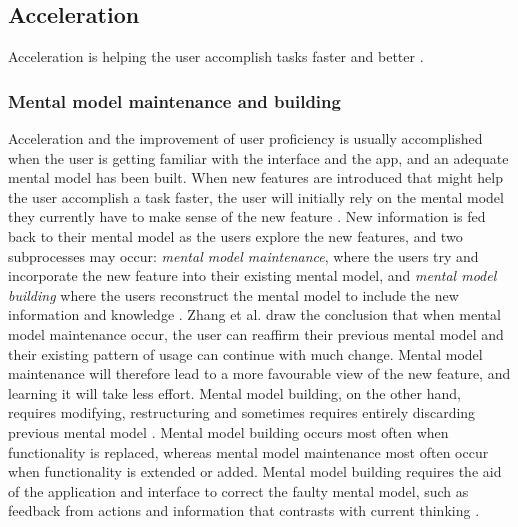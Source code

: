 \subsection{Acceleration}
Acceleration is helping the user accomplish tasks faster and better \cite{Bradt2009}.

\subsubsection{Mental model maintenance and building}
Acceleration and the improvement of user proficiency is usually accomplished when the user is getting familiar with the interface and the app, and an adequate mental model has been built. When new features are introduced that might help the user accomplish a task faster, the user will initially rely on the mental model they currently have to make sense of the new feature \cite{Orlikowski2000}. New information is fed back to their mental model as the users explore the new features, and two subprocesses may occur: \textit{mental model maintenance}, where the users try and incorporate the new feature into their existing mental model, and \textit{mental model building} where the users reconstruct the mental model to include the new information and knowledge \cite{Vandenbosch1996}. Zhang et al. \cite{Zhang2011} draw the conclusion that when mental model maintenance occur, the user can reaffirm their previous mental model and their existing pattern of usage can continue with much change. Mental model maintenance will therefore lead to a more favourable view of the new feature, and learning it will take less effort. Mental model building, on the other hand, requires modifying, restructuring and sometimes requires entirely discarding previous mental model \cite{Vandenbosch1996}. Mental model building occurs most often when functionality is replaced, whereas mental model maintenance most often occur when functionality is extended or added. Mental model building requires the aid of the application and interface to correct the faulty mental model, such as feedback from actions and information that contrasts with current thinking \cite{Hsu2011}.

